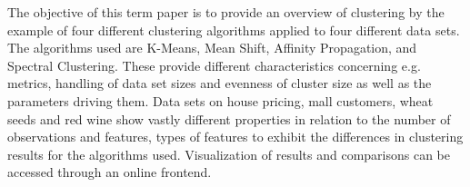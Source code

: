 The objective of this term paper is to provide an overview of clustering by the example of four different clustering algorithms applied to four different data sets. The algorithms used are K-Means, Mean Shift, Affinity Propagation, and Spectral Clustering. These provide different characteristics concerning e.g. metrics, handling of data set sizes and evenness of cluster size as well as the parameters driving them. Data sets on house pricing, mall customers, wheat seeds and red wine show vastly different properties in relation to the number of observations and features, types of features to exhibit the differences in clustering results for the algorithms used. Visualization of results and comparisons can be accessed through an online frontend.